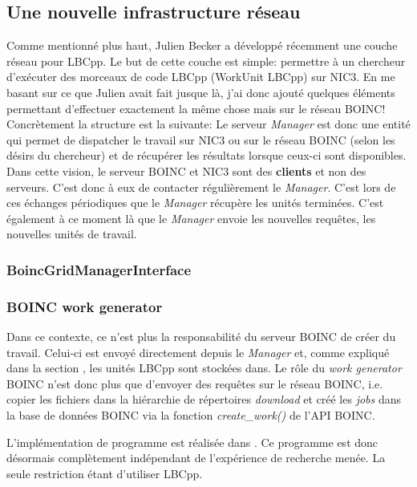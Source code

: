 \documentclass[a4paper, 11pt]{report}
\begin{document}
\subsection{Une nouvelle infrastructure réseau}
Comme mentionné plus haut, Julien Becker a développé récemment une couche réseau pour LBCpp. Le but de cette couche est simple: permettre à un chercheur d'exécuter des morceaux de code LBCpp (WorkUnit LBCpp) sur NIC3. En me basant sur ce que Julien avait fait jusque là, j'ai donc ajouté quelques éléments permettant d'effectuer exactement la même chose mais sur le réseau \textsc{BOINC}!
Concrètement la structure est la suivante:
Le serveur \textit{Manager} est donc une entité qui permet de dispatcher le travail sur NIC3 ou sur le réseau \textsc{BOINC} (selon les désirs du chercheur) et de récupérer les résultats lorsque ceux-ci sont disponibles. Dans cette vision, le serveur \textsc{BOINC} et NIC3 sont des \textbf{clients} et non des serveurs. C'est donc à eux de contacter régulièrement le \textit{Manager}. C'est lors de ces échanges périodiques que le \textit{Manager} récupère les unités terminées. C'est également à ce moment là que le \textit{Manager} envoie les nouvelles requêtes, les nouvelles unités de travail.

\subsubsection{BoincGridManagerInterface}


\subsubsection{BOINC work generator}
Dans ce contexte, ce n'est plus la responsabilité du serveur \textsc{BOINC} de créer du travail. Celui-ci est envoyé directement depuis le \textit{Manager} et, comme expliqué dans la section %
, les unités LBCpp sont stockées dans. %
Le rôle du \textit{work generator} \textsc{BOINC} n'est donc plus que d'envoyer des requêtes sur le réseau \textsc{BOINC}, i.e. copier les fichiers dans la hiérarchie de répertoires \textit{download} et créé les \textit{jobs} dans la base de données \textsc{BOINC} via la fonction \textit{create\_work()} de l'API \textsc{BOINC}. 

L'implémentation de programme est réalisée dans .%
Ce programme est donc désormais complètement indépendant de l'expérience de recherche menée. La seule restriction étant d'utiliser LBCpp.
\end{document}
